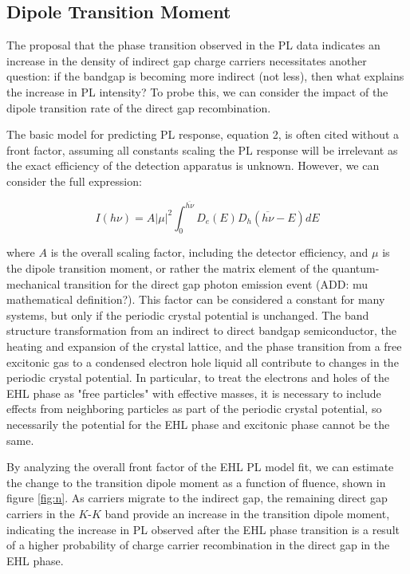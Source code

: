 \documentclass[aps,prb,preprint,groupedaddress]{revtex4-2}
\begin{document}
\subsection{Dipole Transition Moment}

The proposal that the phase transition observed in the PL data indicates an increase in the density of indirect gap charge carriers necessitates another question: if the bandgap is becoming more indirect (not less), then what explains the increase in PL intensity? To probe this, we can consider the impact of the dipole transition rate of the direct gap recombination.

The basic model for predicting PL response, equation 2, is often cited without a front factor, assuming all constants scaling the PL response will be irrelevant as the exact efficiency of the detection apparatus is unknown. However, we can consider the full expression:

\begin{equation} \label{PL Intensity}
I(h\nu) = A |\mu|^2 \int_0^{\overline{h\nu}} D_e(E) D_h(\overline{h\nu} - E) dE
\end{equation}


where $A$ is the overall scaling factor, including the detector efficiency, and $\mu$ is the dipole transition moment, or rather the matrix element of the quantum-mechanical transition for the direct gap photon emission event (ADD: mu mathematical definition?). This factor can be considered a constant for many systems, but only if the periodic crystal potential is unchanged. The band structure transformation from an indirect to direct bandgap semiconductor, the heating and expansion of the crystal lattice, and the phase transition from a free excitonic gas to a condensed electron hole liquid all contribute to changes in the periodic crystal potential. In particular, to treat the electrons and holes of the EHL phase as "free particles" with effective masses, it is necessary to include effects from neighboring particles as part of the periodic crystal potential, so necessarily the potential for the EHL phase and excitonic phase cannot be the same.

By analyzing the overall front factor of the EHL PL model fit, we can estimate the change to the transition dipole moment as a function of fluence, shown in figure \ref{fig:n}. As carriers migrate to the indirect gap, the remaining direct gap carriers in the $K$-$K$ band provide an increase in the transition dipole moment, indicating the increase in PL observed after the EHL phase transition is a result of a higher probability of charge carrier recombination in the direct gap in the EHL phase.
\end{document}
